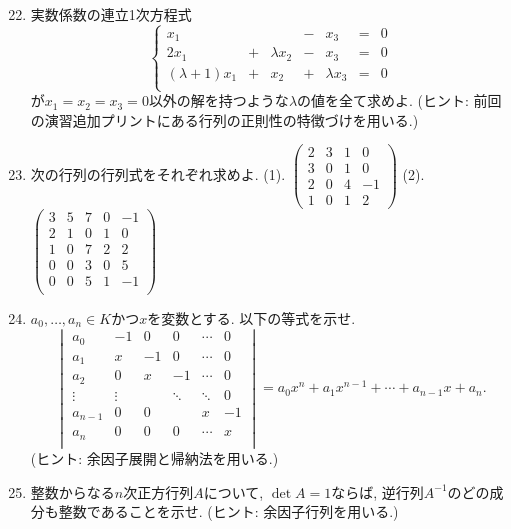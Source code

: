 \documentclass[dvipdfmx,a4paper,11pt]{article} %
\theoremstyle{definition}
\begin{document}
  \begin{enumerate}[label=\textbf{問題}\arabic*.]
 \setcounter{enumi}{21}

 \item 実数係数の連立1次方程式
 $$
 \left\{ 
\begin{matrix}
x_1&  &  &  -& x_3&= & 0\\
2x_1&+&\lambda x_2& -&x_3&= & 0\\
(\lambda + 1)x_1& +&x_2& + &\lambda x_3&=&0\\
\end{matrix}
\right.
 $$
 が$x_1=x_2=x_3=0$以外の解を持つような$\lambda$の値を全て求めよ.
 (ヒント:  前回の演習追加プリントにある行列の正則性の特徴づけを用いる.)
 
 
 \item  次の行列の行列式をそれぞれ求めよ. 
   (1). 
$
 \begin{pmatrix}
2&3 &1&0\\
3&0 &1&0\\
2&0 & 4 & -1\\
1&0 &1 &2
 \end{pmatrix}
 $
   (2). 
 $
 \begin{pmatrix}
  3& 5& 7& 0&-1\\
  2& 1& 0  & 1&0\\
  1& 0& 7 & 2&2\\
  0& 0& 3 & 0&5\\
  0& 0& 5& 1&-1\\
 \end{pmatrix}
 $


 \item $a_0, \ldots, a_n \in K$かつ$x$を変数とする. 
 以下の等式を示せ. 
 $$
 \begin{vmatrix}
a_0   &   -1   &0 &0 & \cdots &  0 \\
a_1   &   x    &-1  &0 & \cdots &  0 \\
a_2   &   0    & x   &-1 & \cdots &  0 \\
\vdots  &    \vdots   &   &\ddots & \ddots &  0 \\
a_{n-1}&   0    & 0   &                  & x&  -1\\
a_n   &   0   & 0   &0 & \cdots &  x\\
\end{vmatrix}
=a_0 x^{n} +  a_1 x^{n-1} +  \cdots +  a_{n-1} x + a_{n}.
$$
(ヒント: 余因子展開と帰納法を用いる.)

 \item 整数からなる$n$次正方行列$A$について, $\det A=1$ならば, 逆行列$A^{-1}$のどの成分も整数であることを示せ. (ヒント: 余因子行列を用いる.)
 
 \end{enumerate}
\end{document}
